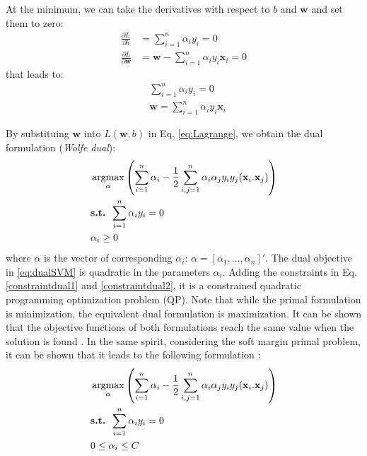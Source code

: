 \noindent At the minimum, we can take the derivatives with respect to $b$ and $\textbf{w}$ and set them to zero:
\begin{align*}
\frac{\partial L}{\partial b} &= \sum\limits_{i=1}^{n}\alpha_i y_i = 0 \\
\frac{\partial L}{\partial \textbf{w}} &= \textbf{w}-\sum\limits_{i=1}^{n}\alpha_i y_i \textbf{x}_i = 0
\end{align*}
\noindent that leads to:
\begin{align}
&\sum\limits_{i=1}^{n}\alpha_i y_i = 0 \\
& \textbf{w} = \sum\limits_{i=1}^{n}\alpha_i y_i \textbf{x}_i
\end{align}

\noindent By substituing $\textbf{w}$ into $L(\textbf{w},b)$ in Eq. \ref{eq:Lagrange}, we obtain the dual formulation (\textit{Wolfe dual}):
\begin{align}
	& \argmax_\alpha \left( 
	\sum\limits_{i=1}^{n} \alpha_i - \frac{1}{2} \sum\limits_{i,j=1}^{n} \alpha_i \alpha_j y_i y_j (\textbf{x}_i . \textbf{x}_j) 
	\right) 
	\label{eq:dualSVM}\\
	& \textbf{s.t. } \sum\limits_{i=1}^{n}\alpha_i y_i = 0 \label{constraintdual1}\\
	& \alpha_i \geq 0 \label{constraintdual2}
\end{align}
where $\alpha$ is the vector of corresponding $\alpha_i$: $\alpha = [\alpha_1, ..., \alpha_n]'$. The dual objective in \ref{eq:dualSVM} is quadratic in the parameters $\alpha_i$. Adding the constraints in Eq. \ref{constraintdual1} and \ref{constraintdual2}, it is a constrained quadratic programming optimization problem (QP). Note that while the primal formulation is minimization, the equivalent dual formulation is maximization. It can be shown that the objective functions of both formulations reach the same value when the solution is found \cite{Campbell2011}. In the same spirit, considering the soft margin primal problem, it can be shown that it leads to the following formulation \cite{Campbell2011}:
\begin{align}
& \argmax_\alpha 
\left( 
\sum\limits_{i=1}^{n} \alpha_i - \frac{1}{2} \sum\limits_{i,j=1}^{n} \alpha_i \alpha_j y_i y_j (\textbf{x}_i . \textbf{x}_j) 
\right) 
\label{eq:dualSVM2}\\
& \textbf{s.t. } \sum\limits_{i=1}^{n}\alpha_i y_i = 0 \label{constraintdual3}\\
& 0 \leq \alpha_i \leq C  \label{constraintdual4}
\end{align}
